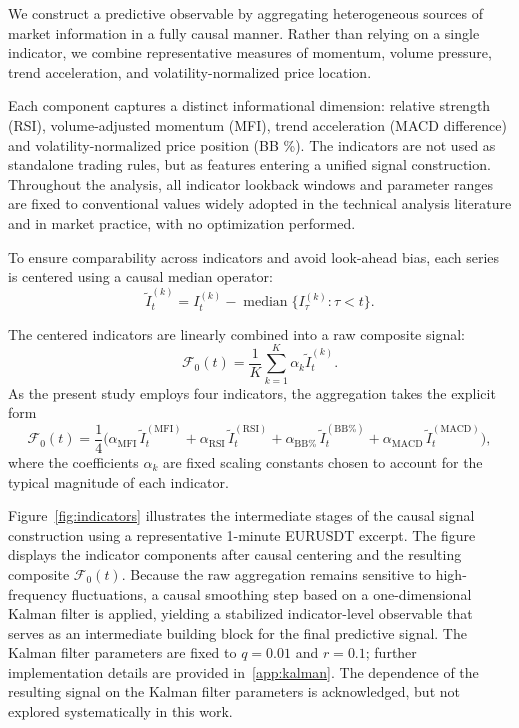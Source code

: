 \documentclass[final,5p,times,twocolumn]{elsarticle}
\begin{document}
We construct a predictive observable by aggregating heterogeneous sources of market information in a fully causal manner.
Rather than relying on a single indicator, we combine representative measures of momentum, volume pressure, trend acceleration, and volatility-normalized price location.

Each component captures a distinct informational dimension: relative strength (RSI), volume-adjusted momentum (MFI), trend acceleration (MACD difference) and volatility-normalized price position (BB \%).
The indicators are not used as standalone trading rules, but as features entering a unified signal construction. Throughout the analysis, all indicator lookback windows and parameter ranges are fixed to conventional values widely adopted in the technical analysis literature and in market practice, with no optimization performed.


To ensure comparability across indicators and avoid look-ahead bias, each series is centered using a causal median operator:
\begin{equation}
\tilde I_t^{(k)} = I_t^{(k)} - \operatorname{median}\{ I_\tau^{(k)} : \tau < t \}.
\end{equation}

The centered indicators are linearly combined into a raw composite signal:
\begin{equation}
\mathscr{F}_0(t) = \frac{1}{K} \sum_{k=1}^K \alpha_k \tilde I_t^{(k)}.
\end{equation}
As the present study employs four indicators, the aggregation takes the explicit form
\begin{equation}
\mathscr{F}_0(t)
 = \frac{1}{4}\Big(
\alpha_{\text{MFI}} \, \tilde I_t^{(\text{MFI})}
+ \alpha_{\text{RSI}} \, \tilde I_t^{(\text{RSI})}
+ \alpha_{\text{BB}\%} \, \tilde I_t^{(\text{BB}\%)}
+ \alpha_{\text{MACD}} \, \tilde I_t^{(\text{MACD})}
\Big),
\end{equation}
where the coefficients $\alpha_k$ are fixed scaling constants chosen to account for the typical magnitude of each indicator.

Figure~\ref{fig:indicators} illustrates the intermediate stages of the causal signal construction using a representative 1-minute EURUSDT excerpt.
The figure displays the indicator components after causal centering and the resulting composite $\mathscr{F}_0(t)$.
Because the raw aggregation remains sensitive to high-frequency fluctuations, a causal smoothing step based on a one-dimensional Kalman filter is applied, yielding a stabilized indicator-level observable that serves as an intermediate building block for the final predictive signal.
The Kalman filter parameters are fixed to $q = 0.01$ and $r = 0.1$; further implementation details are provided in~\ref{app:kalman}.
The dependence of the resulting signal on the Kalman filter parameters is acknowledged, but not explored systematically in this work.
\end{document}
